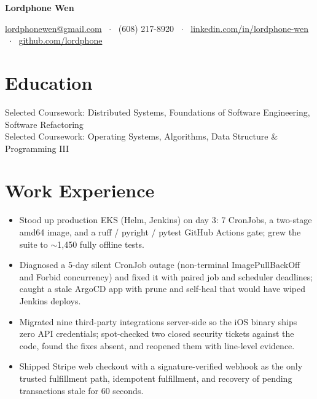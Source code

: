 \documentclass[11pt, letterpaper]{article}
\begin{document}
\noindent
{\LARGE\bfseries Lordphone Wen}%
\hfill
{}\\[5pt]
{\centering
  \href{mailto:lordphonewen@gmail.com}{lordphonewen@gmail.com} \ $\cdot$ \
  (608) 217-8920 \ $\cdot$ \
  \href{https://www.linkedin.com/in/lordphone-wen}{linkedin.com/in/lordphone-wen} \ $\cdot$ \
  \href{https://github.com/lordphone}{github.com/lordphone}\par
}

\section{Education}
Selected Coursework: Distributed Systems, Foundations of Software Engineering, Software Refactoring\\[1pt]
Selected Coursework: Operating Systems, Algorithms, Data Structure \& Programming III

\section{Work Experience}
\begin{itemize}
  \item Stood up production EKS (Helm, Jenkins) on day 3: 7 CronJobs, a two-stage amd64 image, and a ruff / pyright / pytest GitHub Actions gate; grew the suite to $\sim$1{,}450 fully offline tests.
  \item Diagnosed a 5-day silent CronJob outage (non-terminal ImagePullBackOff and Forbid concurrency) and fixed it with paired job and scheduler deadlines; caught a stale ArgoCD app with prune and self-heal that would have wiped Jenkins deploys.
  \item Migrated nine third-party integrations server-side so the iOS binary ships zero API credentials; spot-checked two closed security tickets against the code, found the fixes absent, and reopened them with line-level evidence.
  \item Shipped Stripe web checkout with a signature-verified webhook as the only trusted fulfillment path, idempotent fulfillment, and recovery of pending transactions stale for 60 seconds.
\end{itemize}
\end{document}
